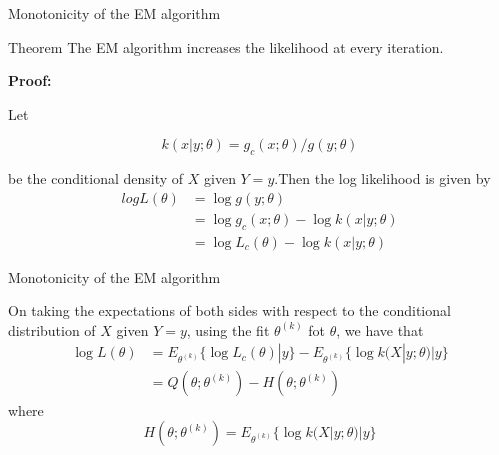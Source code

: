 \documentclass[11pt]{beamer}
\begin{document}
\begin{frame}{Monotonicity of the EM algorithm}

\begin{block}{Theorem}
The EM algorithm increases the likelihood at every iteration.
\end{block}
{\bf Proof:}


Let 

$$ k(x|y;\theta) = g_c(x;\theta)/g(y;\theta)$$ 

be the conditional density of $X$ given $Y=y$.\pause  Then the log likelihood is given by 
\begin{equation}
\begin{split}
log L(\theta) & = \log g(y;\theta) \\
&=  \log g_c (x;\theta) - \log k(x | y;\theta) \\
 &= \log L_c (\theta) - \log k(x | y;\theta)
\end{split}
\end{equation}
\end{frame}

\begin{frame}{Monotonicity of the EM algorithm}

On taking the expectations of both sides with respect to the conditional distribution of $X$ given $Y=y$, using the fit $\theta^{(k)}$ fot $\theta$, we have that 
\begin{equation}
\begin{split}
 \log L(\theta) &= E_{\theta^{(k)}} \{ \log L_c (\theta) | y \} - E_{\theta^{(k)}} \{ \log k(X | y; \theta) | y \} \\
				&= Q(\theta;\theta^{(k)}) - H(\theta;\theta^{(k)}) \end{split} \end{equation}  
\pause
where $$  H(\theta;\theta^{(k)}) = E_{\theta^{(k)}} \{ \log k(X | y; \theta) | y \}$$
 
 


\end{frame}
\end{document}
